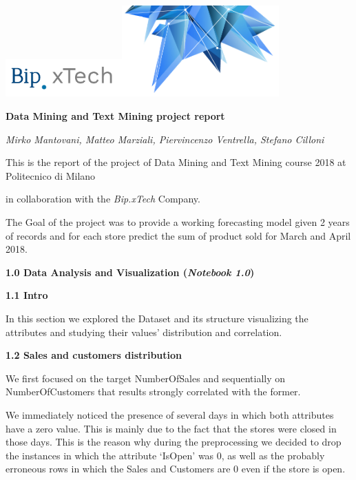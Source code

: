 \documentclass[]{article}
\date{}
\begin{document}
\includegraphics[width=1.76471in,height=0.56863in]{media/image1.png}\includegraphics[width=2.37389in,height=1.37968in]{media/image2.png}

\textbf{Data Mining and Text Mining project report}

\emph{Mirko Mantovani, Matteo Marziali, Piervincenzo Ventrella, Stefano
Cilloni}

This is the report of the project of Data Mining and Text Mining course
2018 at Politecnico di Milano

in collaboration with the \emph{Bip.xTech} Company.

The Goal of the project was to provide a working forecasting model given
2 years of records and for each store predict the sum of product sold
for March and April 2018.

\textbf{1.0 Data Analysis and Visualization (\emph{Notebook 1.0})}

\textbf{1.1 Intro}

\protect\hypertarget{_oomzjappj9bu}{}{}In this section we explored the
Dataset and its structure visualizing the attributes and studying their
values' distribution and
correlation.\protect\hypertarget{_821c2fp89x9}{}{}

\protect\hypertarget{_v4nf0arywnaa}{}{}\textbf{1.2 Sales and customers
distribution}

\protect\hypertarget{_ttwlwjp7deg1}{}{}We first focused on the target
NumberOfSales and sequentially on NumberOfCustomers that results
strongly correlated with the former.

\protect\hypertarget{_lwkzmf1jw6jv}{}{}We immediately noticed the
presence of several days in which both attributes have a zero value.
This is mainly due to the fact that the stores were closed in those
days. This is the reason why during the preprocessing we decided to drop
the instances in which the attribute `IsOpen' was
0\protect\hypertarget{_ifv4rzelzmos}{}{}, as well as the probably
erroneous rows in which the Sales and Customers are 0 even if the store
is open.
\end{document}
